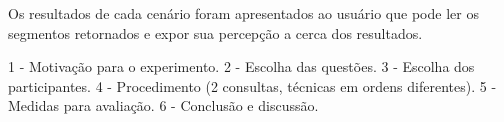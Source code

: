 






Os resultados de cada cenário foram apresentados ao usuário que pode ler os segmentos retornados e expor sua percepção a cerca dos resultados.


 1 - Motivação para o experimento.
 2 - Escolha das questões.
 3 - Escolha dos participantes.
 4 - Procedimento (2 consultas, técnicas em ordens diferentes).
 5 - Medidas para avaliação.
 6 - Conclusão e discussão.



